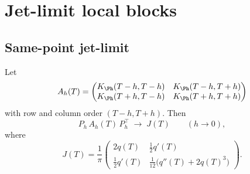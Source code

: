 %
%
%
%

\section{Jet-limit local blocks}
\label{sec:jet-limit-local-blocks}
\quad
{}\quad
{}\quad
{}\quad
{}\quad
{}
\par\medskip

\subsection{Same-point jet-limit}
\label{subsec:same-point-jet-limit}

\begin{lemma}
\label{lem:same-point-jet-limit}
Let
\[
A_h(T)=
\begin{pmatrix}
K_\Ph(T-h,T-h) & K_\Ph(T-h,T+h)\\
K_\Ph(T+h,T-h) & K_\Ph(T+h,T+h)
\end{pmatrix}
\]
with row and column order \((T-h,T+h)\).  Then
\[
P_h\,A_h(T)\,P_h^\top \;\longrightarrow\; J(T)
\qquad (h\to 0),
\]
where
\begin{equation}
\label{eq:same-point-J}
J(T)=\frac1\pi
\begin{pmatrix}
2q(T) & \tfrac12 q'(T)\\[1ex]
\tfrac12 q'(T) & \tfrac1{12}\bigl(q''(T)+2q(T)^3\bigr)
\end{pmatrix}.
\end{equation}
\end{lemma}

